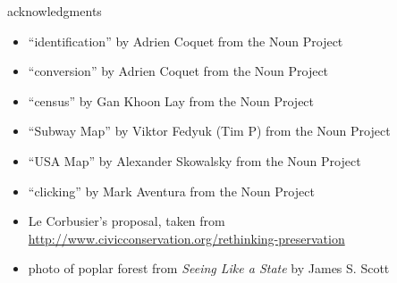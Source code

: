 \documentclass[presentation]{subfiles}
\begin{document}
\begin{frame}{acknowledgments}

\begin{itemize}
  \item ``identification'' by Adrien Coquet from the Noun Project
  \item ``conversion'' by Adrien Coquet from the Noun Project
  \item ``census'' by Gan Khoon Lay from the Noun Project
  \item ``Subway Map'' by Viktor Fedyuk (Tim P) from the Noun Project
  \item ``USA Map'' by Alexander Skowalsky from the Noun Project
  \item ``clicking'' by Mark Aventura from the Noun Project
  \item Le Corbusier's proposal, taken from \url{http://www.civicconservation.org/rethinking-preservation}
  \item photo of poplar forest from \textit{Seeing Like a State} by James S. Scott
\end{itemize}

\end{frame}
\end{document}

